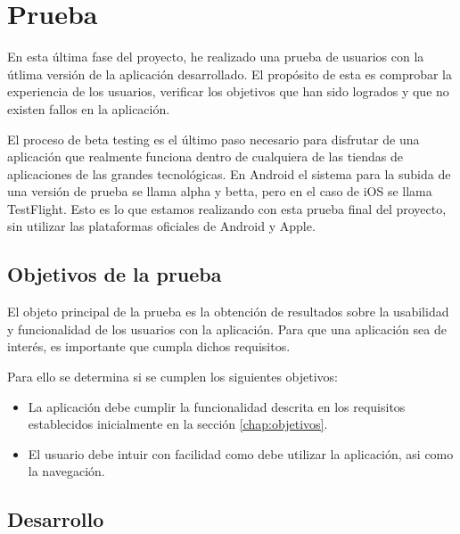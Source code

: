 \documentclass[a4paper, 12pt]{book}
\begin{document}

\cleardoublepage
\chapter{Prueba}

En esta \'ultima fase del proyecto, he realizado una prueba de usuarios con la \'utlima versi\'on de la aplicaci\'on desarrollado. El prop\'osito de esta es comprobar la experiencia de los usuarios, verificar los objetivos que han sido logrados y que no existen fallos en la aplicaci\'on. 

El proceso de beta testing es el \'ultimo paso necesario para disfrutar de una aplicaci\'on que realmente funciona dentro de cualquiera de las tiendas de aplicaciones de las grandes tecnol\'ogicas. En Android el sistema para la subida de una versi\'on de prueba se llama alpha y betta, pero en el caso de iOS se llama TestFlight. Esto es lo que estamos realizando con esta prueba final del proyecto, sin utilizar las plataformas oficiales de Android y Apple.

\section{Objetivos de la prueba} 
\label{sec:seguridad}

El objeto principal de la prueba es la obtenci\'on de resultados sobre la usabilidad y funcionalidad de los usuarios con la aplicaci\'on. Para que una aplicaci\'on sea de inter\'es, es importante que cumpla dichos requisitos.

Para ello se determina si se cumplen los siguientes objetivos:
\begin{itemize}
\item La aplicaci\'on debe cumplir la funcionalidad descrita en los requisitos establecidos inicialmente en la secci\'on \ref{chap:objetivos}.
\item El usuario debe intuir con facilidad como debe utilizar la aplicaci\'on, asi como la navegaci\'on.
\end{itemize}

\section{Desarrollo} 
\label{sec:seguridad}
\end{document}
